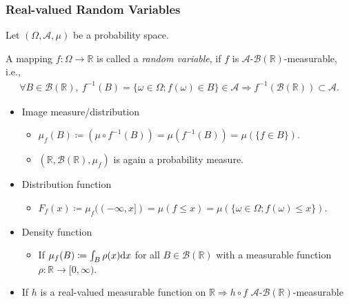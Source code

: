 \documentclass[oneside]{article}
\numberwithin{equation}{section}
\begin{document}
\subsubsection{Real-valued Random Variables}
Let $(\Omega,\mathcal{A},\mu)$ be a probability space.

A mapping $f:\Omega\to\mathbb{R}$ is called a \textit{random variable}, if $f$ is $\mathcal{A}$-$\mathcal{B}(\mathbb{R})$-measurable, i.e.,
\begin{align*}
    \forall B\in\mathcal{B}(\mathbb{R}),\ f^{-1}(B) = \{\omega\in\Omega;f(\omega)\in B\}\in\mathcal{A}\Rightarrow f^{-1}(\mathcal{B}(\mathbb{R}))\subset\mathcal{A}.
\end{align*}
\begin{itemize}
    \item Image measure/distribution
    \begin{itemize}
        \item $\mu_f(B)\coloneqq(\mu\circ f^{-1}(B)) = \mu(f^{-1}(B)) = \mu(\{f\in B\})$.
        \item $(\mathbb{R},\mathcal{B}(\mathbb{R}),\mu_f)$ is again a probability measure.
    \end{itemize}
    \item Distribution function
    \begin{itemize}
        \item $F_f(x)\coloneqq\mu_f((-\infty,x]) = \mu(f\le x) = \mu(\{\omega\in\Omega;f(\omega)\le x\})$.
    \end{itemize}
    \item Density function
    \begin{itemize}
        \item If $\mu_f(B)\coloneqq\int_B \rho(x){\rm d}x$ for all $B\in\mathcal{B}(\mathbb{R})$ with a measurable function $\rho:\mathbb{R}\to[0,\infty)$.
    \end{itemize}
    \item If $h$ is a real-valued measurable function on $\mathbb{R}\Rightarrow h\circ f$ $\mathcal{A}$-$\mathcal{B}(\mathbb{R})$-measurable
\end{itemize}
\end{document}
